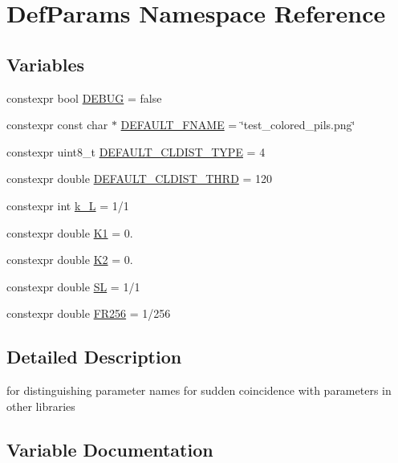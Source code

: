 \hypertarget{namespace_def_params}{}\section{Def\+Params Namespace Reference}
\label{namespace_def_params}
\subsection*{Variables}
\begin{DoxyCompactItemize}
\item 
constexpr bool \mbox{\hyperlink{namespace_def_params_a7e97783bd3e1a571a7f6c2297cbcd17c}{D\+E\+B\+UG}} = false
\item 
constexpr const char $\ast$ \mbox{\hyperlink{namespace_def_params_a4ecb94d634ccb0839d655d8b4d49f10e}{D\+E\+F\+A\+U\+L\+T\+\_\+\+F\+N\+A\+ME}} = \char`\"{}test\+\_\+colored\+\_\+pils.\+png\char`\"{}
\item 
constexpr uint8\+\_\+t \mbox{\hyperlink{namespace_def_params_a96abaa9fd1fd3e492f2c968328d78cd7}{D\+E\+F\+A\+U\+L\+T\+\_\+\+C\+L\+D\+I\+S\+T\+\_\+\+T\+Y\+PE}} = 4
\item 
constexpr double \mbox{\hyperlink{namespace_def_params_a916e62b53c201e054434217cc5d70a0a}{D\+E\+F\+A\+U\+L\+T\+\_\+\+C\+L\+D\+I\+S\+T\+\_\+\+T\+H\+RD}} = 120
\item 
constexpr int \mbox{\hyperlink{namespace_def_params_a6e01701980f316db62c9b09a8f4a033d}{k\+\_\+L}} = 1/1
\item 
constexpr double \mbox{\hyperlink{namespace_def_params_ade015d45cc93072e45d278d5e5be7ebb}{K1}} = 0.
\item 
constexpr double \mbox{\hyperlink{namespace_def_params_af4d7a411a81848498791ad3cf73ff4eb}{K2}} = 0.
\item 
constexpr double \mbox{\hyperlink{namespace_def_params_af164df797c0355e3137b26b6cdae35a3}{SL}} = 1/1
\item 
constexpr double \mbox{\hyperlink{namespace_def_params_ace7abc998b941cb3abdff5202b95b54d}{F\+R256}} = 1/256
\end{DoxyCompactItemize}


\subsection{Detailed Description}
for distinguishing parameter names for sudden coincidence with parameters in other libraries 

\subsection{Variable Documentation}
\mbox{\label{namespace_def_params_a7e97783bd3e1a571a7f6c2297cbcd17c}} 
